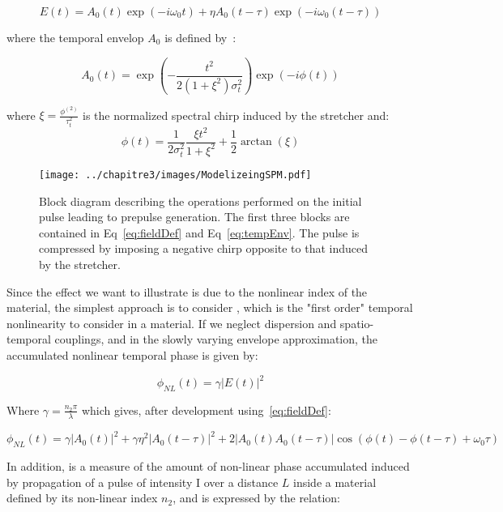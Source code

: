 \begin{equation}
\label{eq:fieldDef}
E(t) = A_{0}(t)\exp(-i\omega_0 t)+\eta A_0(t-\tau)\exp(-i\omega_0 (t-\tau))
\end{equation}

\noindent where the temporal envelop $A_0$ is defined by~\cite{TheseArnaud}:

\begin{equation}
\label{eq:tempEnv}
A_0(t) = \exp(-\frac{t^2}{2(1+\xi^2)\sigma_t^2})\exp(-i\phi(t))
\end{equation}


\noindent  where $\xi = \frac{\phi^{(2)}}{\tau_t^2}$ is the normalized spectral chirp induced by the stretcher and: 
$$
\phi(t) = \frac{1}{2\sigma_t^2}\frac{\xi t^2}{1+\xi^2}+ \frac{1}{2}\arctan(\xi)
$$

\begin{figure}[H]
\centering
\texttt{[image: ../chapitre3/images/ModelizeingSPM.pdf]}\\
\caption{\label{fig:ModelizeingSPM} Block diagram describing the operations performed on the initial pulse leading to prepulse generation. The first three blocks are contained in Eq~\ref{eq:fieldDef} and Eq~\ref{eq:tempEnv}. The pulse is compressed by imposing a negative chirp opposite to that induced by the stretcher.}
\end{figure}

\noindent  Since the effect we want to illustrate is due to the nonlinear index of the material, the simplest approach is to consider , which is the "first order" temporal nonlinearity to consider in a material.
If we neglect dispersion and spatio-temporal couplings, and in the slowly varying envelope approximation, the accumulated nonlinear temporal phase is given by:

\begin{equation}
\phi_{NL}(t) = \gamma|E(t)|^2
\end{equation}

\noindent  Where $\gamma = \frac{n_2\pi}{\lambda}$ which gives, after development using~\ref{eq:fieldDef}:

\begin{equation}
\label{eq:Interf}
\phi_{NL}(t) = \gamma|A_0(t)|^2+\gamma\eta^2|A_0(t-\tau)|^2+2|A_0(t)A_0(t-\tau)|\cos(\phi(t)-\phi(t-\tau)+\omega_0\tau)
\end{equation}

\noindent In addition,  is a measure of the amount of non-linear phase accumulated induced by propagation of a pulse of intensity I over a distance $L$ inside a material defined by its non-linear index $n_2$, and is expressed by the relation:

